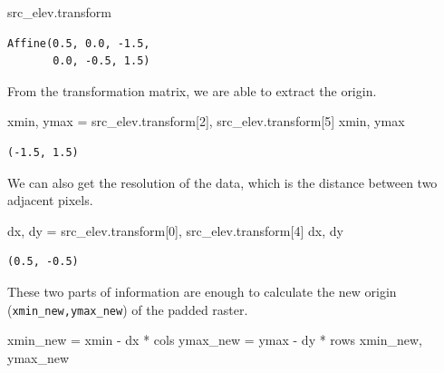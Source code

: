 \documentclass[
  letterpaper,
]{krantz}
\newenvironment{Shaded}{\begin{snugshade}}{\end{snugshade}}
\newcommand{\DecValTok}[1]{\textcolor[rgb]{0.68,0.00,0.00}{#1}}
\newcommand{\NormalTok}[1]{\textcolor[rgb]{0.00,0.23,0.31}{#1}}
\newcommand{\OperatorTok}[1]{\textcolor[rgb]{0.37,0.37,0.37}{#1}}
\begin{document}
\begin{Shaded}
\begin{Highlighting}[]
\NormalTok{src\_elev.transform }
\end{Highlighting}
\end{Shaded}

\begin{verbatim}
Affine(0.5, 0.0, -1.5,
       0.0, -0.5, 1.5)
\end{verbatim}

From the transformation matrix, we are able to extract the origin.

\begin{Shaded}
\begin{Highlighting}[]
\NormalTok{xmin, ymax }\OperatorTok{=}\NormalTok{ src\_elev.transform[}\DecValTok{2}\NormalTok{], src\_elev.transform[}\DecValTok{5}\NormalTok{]}
\NormalTok{xmin, ymax}
\end{Highlighting}
\end{Shaded}

\begin{verbatim}
(-1.5, 1.5)
\end{verbatim}

We can also get the resolution of the data, which is the distance
between two adjacent pixels.

\begin{Shaded}
\begin{Highlighting}[]
\NormalTok{dx, dy }\OperatorTok{=}\NormalTok{ src\_elev.transform[}\DecValTok{0}\NormalTok{], src\_elev.transform[}\DecValTok{4}\NormalTok{]}
\NormalTok{dx, dy}
\end{Highlighting}
\end{Shaded}

\begin{verbatim}
(0.5, -0.5)
\end{verbatim}

These two parts of information are enough to calculate the new origin
(\texttt{xmin\_new,ymax\_new}) of the padded raster.

\begin{Shaded}
\begin{Highlighting}[]
\NormalTok{xmin\_new }\OperatorTok{=}\NormalTok{ xmin }\OperatorTok{{-}}\NormalTok{ dx }\OperatorTok{*}\NormalTok{ cols}
\NormalTok{ymax\_new }\OperatorTok{=}\NormalTok{ ymax }\OperatorTok{{-}}\NormalTok{ dy }\OperatorTok{*}\NormalTok{ rows}
\NormalTok{xmin\_new, ymax\_new}
\end{Highlighting}
\end{Shaded}
\end{document}
